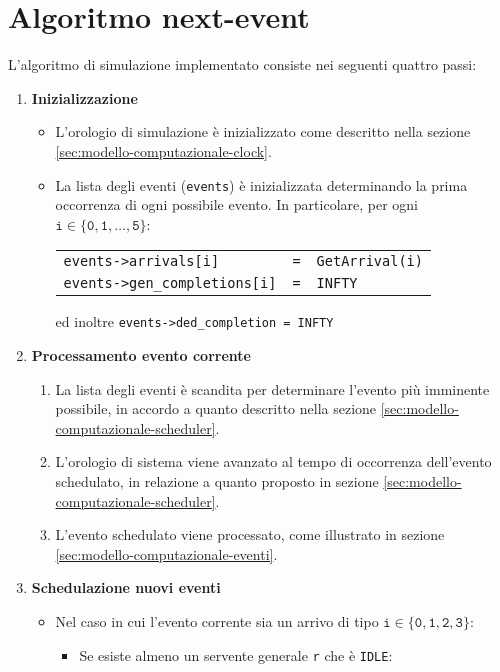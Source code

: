 \section{Algoritmo next-event}\label{sec:modello-computazionale-algoritmo}
L'algoritmo di simulazione implementato consiste nei seguenti quattro passi:
\begin{enumerate}[label=Step \arabic*), align=left, leftmargin=*]
\item \textbf{Inizializzazione}
\begin{itemize}
\item L'orologio di simulazione è inizializzato come descritto nella sezione \ref{sec:modello-computazionale-clock}.
\item La lista degli eventi (\texttt{events}) è inizializzata determinando la prima occorrenza di ogni possibile evento. In particolare, per ogni $\mathtt{i \in \lbrace 0, 1, \dots, 5\rbrace}$:
\begin{center}
\begin{tabular}{l l l}
\texttt{events->arrivals[i]} & \texttt{=} & \texttt{GetArrival(i)} \\
\texttt{events->gen\_completions[i]} & \texttt{=} & \texttt{INFTY}
\end{tabular}
\end{center}
ed inoltre \texttt{events->ded\_completion = INFTY}
\end{itemize}
\item \textbf{Processamento evento corrente}
\begin{enumerate}
\item La lista degli eventi è scandita per determinare l'evento più imminente possibile, in accordo a quanto descritto nella sezione \ref{sec:modello-computazionale-scheduler}.
\item L'orologio di sistema viene avanzato al tempo di occorrenza dell'evento schedulato, in relazione a quanto proposto in sezione \ref{sec:modello-computazionale-scheduler}.
\item L'evento schedulato viene processato, come illustrato in sezione \ref{sec:modello-computazionale-eventi}.
\end{enumerate}
\item \textbf{Schedulazione nuovi eventi}
\begin{itemize}
\item Nel caso in cui l'evento corrente sia un arrivo di tipo $\mathtt{i \in \lbrace 0, 1, 2, 3 \rbrace}$:
\begin{itemize}
\item Se esiste almeno un servente generale \texttt{r} che è \texttt{IDLE}:

\end{itemize}
\end{itemize}
\end{enumerate}
